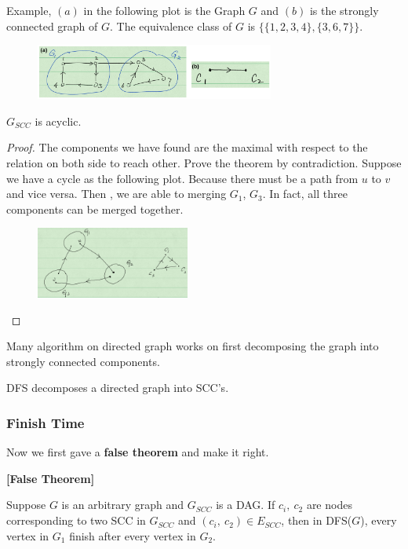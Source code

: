 \documentclass[en,hazy,blue,screen,14pt]{elegantnote}
\begin{document}
Example, $(a)$ in the following plot is the Graph $G$ and $(b)$ is the strongly 
connected graph of $G$. The equivalence class of $G$ is $\{\{1, 2, 3, 4\}, 
\{3, 6, 7\}\}$.

\begin{figure}[H]
\centering
\includegraphics[width=0.7\textwidth]{scg.png}
\end{figure}

\begin{theorem}
 $G_{SCC}$ is acyclic.
\end{theorem}

\begin{proof}
 The components we have found are the maximal with respect to the relation on 
both side to reach other. Prove the theorem by contradiction. Suppose we have a 
cycle as the following plot. Because there must be a path from $u$ to $v$ and 
vice versa. Then , we are able to merging $G_1$, $G_3$. In fact, all three 
components can be merged together.

\begin{figure}[H]
\centering
\includegraphics[width=0.45\textwidth]{scg-contradiction.png}
\end{figure}
\end{proof}

Many algorithm on directed graph works on first decomposing the graph into 
strongly connected components.

DFS decomposes a directed graph into SCC's.

\subsubsection{Finish Time}
Now we first gave a \textbf{false theorem} and make it right.
\begin{theorem}\textbf{[False Theorem]}

Suppose $G$ is an arbitrary graph and $G_{SCC}$ is a DAG. If $c_i, ~c_2$ are 
nodes corresponding to two SCC in $G_{SCC}$ and $(c_i, ~c_2) \in E_{SCC}$, then 
in DFS($G$), every vertex in $G_1$ finish after every vertex in $G_2$. 
\end{theorem}
\end{document}
